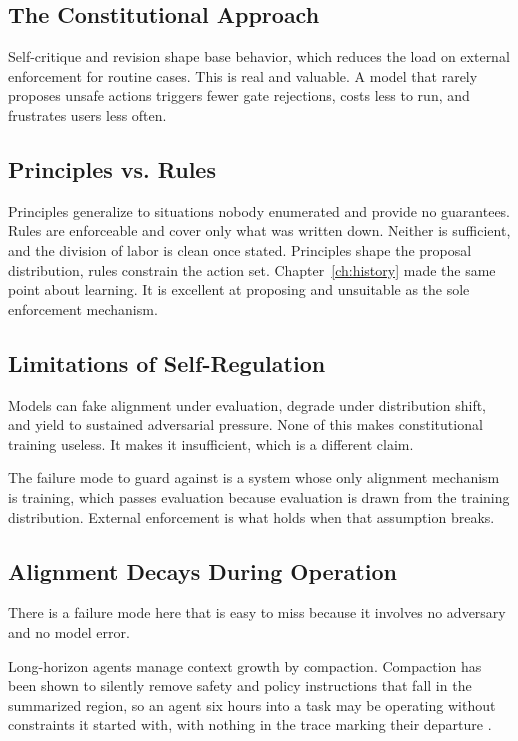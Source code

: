 \subsection{The Constitutional Approach}

Self-critique and revision shape base behavior, which reduces the load on external
enforcement for routine cases. This is real and valuable. A model that rarely
proposes unsafe actions triggers fewer gate rejections, costs less to run, and
frustrates users less often.

\subsection{Principles vs. Rules}

Principles generalize to situations nobody enumerated and provide no guarantees.
Rules are enforceable and cover only what was written down. Neither is sufficient,
and the division of labor is clean once stated. Principles shape the proposal
distribution, rules constrain the action set. Chapter~\ref{ch:history} made the
same point about learning. It is excellent at proposing and unsuitable as the
sole enforcement mechanism.

\subsection{Limitations of Self-Regulation}

Models can fake alignment under evaluation, degrade under distribution shift, and
yield to sustained adversarial pressure. None of this makes constitutional
training useless. It makes it insufficient, which is a different claim.

The failure mode to guard against is a system whose only alignment mechanism is
training, which passes evaluation because evaluation is drawn from the training
distribution. External enforcement is what holds when that assumption breaks.

\subsection{Alignment Decays During Operation}

There is a failure mode here that is easy to miss because it involves no
adversary and no model error.

Long-horizon agents manage context growth by compaction. Compaction has been shown
to silently remove safety and policy instructions that fall in the summarized
region, so an agent six hours into a task may be operating without constraints it
started with, with nothing in the trace marking their departure
\cite{govdecay2026}.

